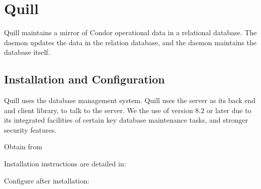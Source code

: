 \section{\label{sec:Quill}Quill}

Quill maintains a mirror of Condor operational data
in a relational database.  The  daemon updates
the data in the relation database, and the  daemon
maintains the database itself.

\subsection{\label{sec:Quill-Installation}Installation and Configuration}

Quill uses the  database management system.
Quill uses the  server as its back end
and client library, 
 to talk to the server.
We  the use of version 
8.2 or later due to its integrated facilities of certain key 
database maintenance tasks, and stronger security features.

Obtain  from


Installation instructions are detailed in:

Configure  after installation:

